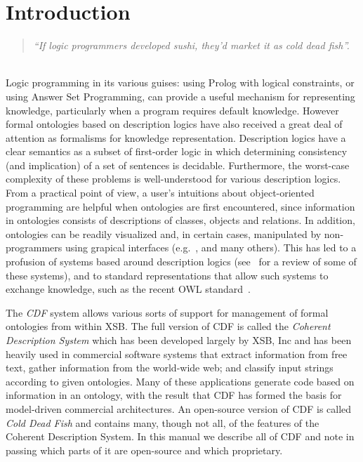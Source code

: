 
\chapter{Introduction}

\begin{quote}
{\it  ``If logic programmers developed sushi, they'd market it as
cold dead fish''.} 
\end{quote}
\ \\

Logic programming in its various guises: using Prolog with logical
constraints, or using Answer Set Programming, can provide a useful
mechanism for representing knowledge, particularly when a program
requires default knowledge.  However formal ontologies based on
description logics have also received a great deal of attention as
formalisms for knowledge representation.  Description logics have a
clear semantics as a subset of first-order logic in which determining
consistency (and implication) of a set of sentences is decidable.
Furthermore, the worst-case complexity of these problems is
well-understood for various description logics.  From a practical
point of view, a user's intuitions about object-oriented programming
are helpful when ontologies are first encountered, since information
in ontologies consists of descriptions of classes, objects and
relations.  In addition, ontologies can be readily visualized and, in
certain cases, manipulated by non-programmers using grapical
interfaces (e.g.~\cite{protege}, and many others).  This has led to a
profusion of systems based around description logics
(see~\cite{MolH03} for a review of some of these systems), and to
standard representations that allow such systems to exchange
knowledge, such as the recent OWL standard~\cite{SMVW02}.

The {\em CDF} system allows various sorts of support for management of
formal ontologies from within XSB.  The full version of CDF is called
the {\em Coherent Description System} which has been developed largely
by XSB, Inc and has been heavily used in commercial software systems
that extract information from free text, gather information from the
world-wide web; and classify input strings according to given
ontologies.  Many of these applications generate code based on
information in an ontology, with the result that CDF has formed the
basis for model-driven commercial architectures.  An open-source
version of CDF is called {\em Cold Dead Fish} and contains many,
though not all, of the features of the Coherent Description System.
In this manual we describe all of CDF and note in passing which parts
of it are open-source and which proprietary.

